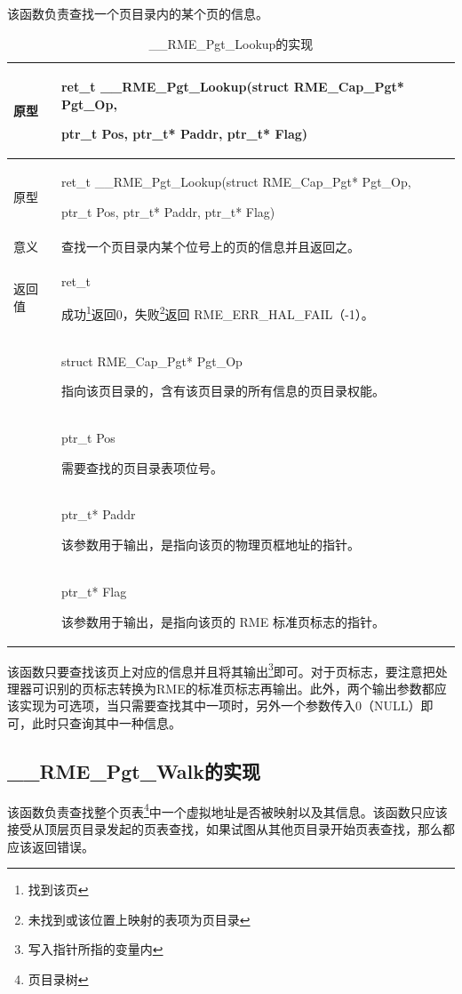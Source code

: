该函数负责查找一个页目录内的某个页的信息。

\begin{xltabular}{\textwidth}{@{}>{\hsize\raggedright\arraybackslash}X>{\hsize\raggedright\arraybackslash}X@{}}
\caption{\_\_RME\_Pgt\_Lookup的实现}\label{tab:7-83-rme-pgt-lookup-implementation}\\
\toprule
原型\strut
 & ret\_t \_\_RME\_Pgt\_Lookup(struct RME\_Cap\_Pgt* Pgt\_Op,

ptr\_t Pos, ptr\_t* Paddr, ptr\_t* Flag)\strut
\tabularnewline
\endfirsthead
\toprule
原型\strut
 & ret\_t \_\_RME\_Pgt\_Lookup(struct RME\_Cap\_Pgt* Pgt\_Op,

ptr\_t Pos, ptr\_t* Paddr, ptr\_t* Flag)\strut
\tabularnewline
\midrule
\endhead
\bottomrule
\endlastfoot
意义 & 查找一个页目录内某个位号上的页的信息并且返回之。\tabularnewline
返回值\strut
 & ret\_t

成功\footnote{找到该页}返回0，失败\footnote{未找到或该位置上映射的表项为页目录}返回 RME\_ERR\_HAL\_FAIL（-1）。\strut
\tabularnewline
{} & struct RME\_Cap\_Pgt* Pgt\_Op

指向该页目录的，含有该页目录的所有信息的页目录权能。\strut
\tabularnewline
\strut
 & ptr\_t Pos

需要查找的页目录表项位号。\strut
\tabularnewline
\strut
 & ptr\_t* Paddr

该参数用于输出，是指向该页的物理页框地址的指针。\strut
\tabularnewline
\strut
 & ptr\_t* Flag

该参数用于输出，是指向该页的 RME 标准页标志的指针。\strut
\tabularnewline
\end{xltabular}

该函数只要查找该页上对应的信息并且将其输出\footnote{写入指针所指的变量内}即可。对于页标志，要注意把处理器可识别的页标志转换为RME的标准页标志再输出。此外，两个输出参数都应该实现为可选项，当只需要查找其中一项时，另外一个参数传入0（NULL）即可，此时只查询其中一种信息。

\subsection{\_\_RME\_Pgt\_Walk的实现}\label{subsec:7-rme-pgt-walk-implementation}

该函数负责查找整个页表\footnote{页目录树}中一个虚拟地址是否被映射以及其信息。该函数只应该接受从顶层页目录发起的页表查找，如果试图从其他页目录开始页表查找，那么都应该返回错误。

